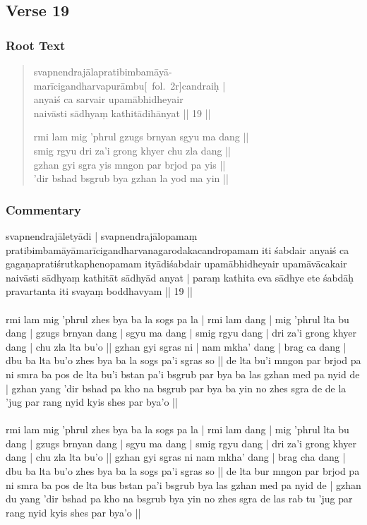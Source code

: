 \documentclass[12pt]{article}
\begin{document}
\subsection{Verse 19}
\subsubsection{Root Text}
\begin{quote}
	svapnendrajālapratibimbamāyā-\\
	marīcigandharvapurāmbu{[}\MS\ fol.\ 2r{]}candraiḥ |\\
	anyaiś ca sarvair upamābhidheyair \\
	naivāsti sādhyaṃ kathitādihānyat || 19 ||

	rmi lam mig 'phrul gzugs brnyan sgyu ma dang || \\
	smig rgyu dri za'i grong khyer chu zla dang || \\
	gzhan gyi sgra yis mngon par brjod pa yis || \\
	'dir bshad bsgrub bya gzhan la yod ma yin || 
\end{quote}

\subsubsection{Commentary}
svapnendrajāletyādi | svapnendrajālopamaṃ pratibimbamāyāmarīcigandharvanagarodakacandropamam iti śabdair anyaiś ca gagaṇapratiśrutkaphenopamam ityādiśabdair upamābhidheyair upamāvācakair naivāsti sādhyaṃ kathitāt sādhyād anyat | paraṃ kathita eva sādhye ete śabdāḥ pravartanta iti svayaṃ boddhavyam || 19 ||\\

\textbf{\TVA}\\
rmi lam mig 'phrul zhes bya ba la sogs pa la | rmi lam dang | mig 'phrul lta bu dang | gzugs brnyan dang | sgyu ma dang | smig rgyu dang | dri za'i grong khyer dang | chu zla lta bu'o || gzhan gyi sgras ni | nam mkha' dang | brag ca dang | dbu ba lta bu'o zhes bya ba la sogs pa'i sgras so || de lta bu'i mngon par brjod pa ni smra ba pos de lta bu'i bstan pa'i bsgrub par bya ba las gzhan med pa nyid de | gzhan yang 'dir bshad pa kho na bsgrub par bya ba yin no zhes sgra de de la 'jug par rang nyid kyis shes par bya'o || \\

\textbf{\TVB}\\
rmi lam mig 'phrul zhes bya ba la sogs pa la | rmi lam dang | mig 'phrul lta bu dang | gzugs brnyan dang | sgyu ma dang | smig rgyu dang | dri za'i grong khyer dang | chu zla lta bu'o || gzhan gyi sgras ni nam mkha' dang | brag cha dang | dbu ba lta bu'o zhes bya ba la sogs pa'i sgras so || de lta bur mngon par brjod pa ni smra ba pos de lta bus bstan pa'i bsgrub bya las gzhan med pa nyid de | gzhan du yang 'dir bshad pa kho na bsgrub bya yin no zhes sgra de las rab tu 'jug par rang nyid kyis shes par bya'o || 
\end{document}
